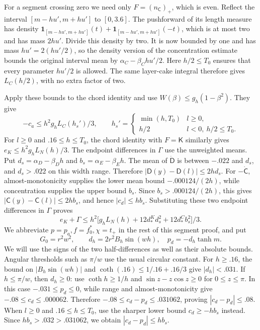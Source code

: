For a segment crossing zero we need only $F=(n_{\mathsf C})_+$, which is even. Reflect the interval $[m-hu',m+hu']$ to $[0,3.6]$. The pushforward of its length measure has density $\mathbf1_{[m-hu',m+hu']}(t)+ \mathbf1_{[m-hu',m+hu']}(-t)$, which is at most two and has mass $2hu'$. Divide this density by two. It is now bounded by one and has mass $hu'=2(hu'/2)$, so the density version of the concentration estimate bounds the original interval mean by $\alpha_C-\beta_Chu'/2$. Here $h/2\le T_0$ ensures that every parameter $hu'/2$ is allowed. The same layer-cake integral therefore gives $L_C(h/2)$, with no extra factor of two.

Apply these bounds to the chord identity and use $W(\beta)\le g_h(1-\beta^2)$. They give
\begin{equation}
 -c_a\le h^2 g_h L_C(h_s')/3,\qquad
 h_s'=\begin{cases}\min(h,T_0)& l\ge0,\\ h/2&l<0,\ h/2\le T_0.\end{cases}                 \tag{s2}\label{eq:s2}
\end{equation}
For $l\ge0$ and $.16\le h\le T_0$, the chord identity with $F=\mathsf K$ similarly gives $e_K\le h^2g_hL_N(h)/3$. The endpoint differences in $\Gamma$ use the unweighted means. Put $d_s=\alpha_D-\beta_Dh$ and $b_s=\alpha_E-\beta_Eh$. The mean of $\dot{\mathsf D}$ is between $-.022$ and $d_s$, and $d_s>.022$ on this width range. Therefore $|\mathsf D(y)-\mathsf D(l)|\le2hd_s$. For $-\dot{\mathsf C}$, almost-monotonicity supplies the lower mean bound $-.000124/(2h)$, while concentration supplies the upper bound $b_s$. Since $b_s>.000124/(2h)$, this gives $|\mathsf C(y)-\mathsf C(l)|\le2hb_s$, and hence $|c_d|\le hb_s$. Substituting these two endpoint differences in $\Gamma$ proves
\begin{equation}
 e_K+\Gamma\le h^2\big[g_h L_N(h)+12d_*^K d_s^2+12d_*^C b_s^2\big]/3.                \tag{s3}\label{eq:s3}
\end{equation}
We abbreviate $p=p_a, f=f_0^*, \chi=t_+$ in the rest of this segment proof, and put
\[
 G_0=r^2w^2,\qquad d_h=2r^2 B_h\sin(wh),\quad p_d=-d_h\tanh m.
\]
We will use the signs of the two half-differences as well as their absolute bounds. Angular thresholds such as $\pi/w$ use the usual circular constant. For $h\ge.16$, the bound on $|B_h\sin(wh)|$ and $\coth(.16)\le1/.16+.16/3$ give $|d_h|<.031$. If $h\le\pi/w$, then $d_h\ge0$: use $\coth h\ge1/h$ and $\sin z-z\cos z\ge0$ for $0\le z\le\pi$. In this case $-.031\le p_d\le0$, while range and almost-monotonicity give $-.08\le c_d\le.000062$. Therefore $-.08\le c_d-p_d\le.031062$, proving $|c_d-p_d|\le.08$. When $l\ge0$ and $.16\le h\le T_0$, use the sharper lower bound $c_d\ge-hb_s$ instead. Since $hb_s>.032>.031062$, we obtain $|c_d-p_d|\le hb_s$.

